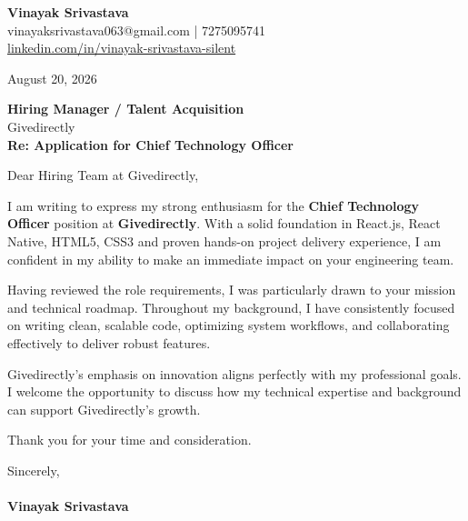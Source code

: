 \documentclass[11pt,a4paper]{article}
\begin{document}
\thispagestyle{empty}

{\Large \textbf{Vinayak Srivastava}}\\
vinayaksrivastava063@gmail.com | 7275095741 \\
\url{linkedin.com/in/vinayak-srivastava-silent}

\vspace{1em}
\hfill August 20, 2026

\textbf{Hiring Manager / Talent Acquisition}\\
Givedirectly\\

\vspace{1.5em}
\textbf{Re: Application for Chief Technology Officer}

\vspace{1em}
Dear Hiring Team at Givedirectly,

I am writing to express my strong enthusiasm for the \textbf{Chief Technology Officer} position at \textbf{Givedirectly}. With a solid foundation in React.js, React Native, HTML5, CSS3 and proven hands-on project delivery experience, I am confident in my ability to make an immediate impact on your engineering team.

Having reviewed the role requirements, I was particularly drawn to your mission and technical roadmap. Throughout my background, I have consistently focused on writing clean, scalable code, optimizing system workflows, and collaborating effectively to deliver robust features.

Givedirectly's emphasis on innovation aligns perfectly with my professional goals. I welcome the opportunity to discuss how my technical expertise and background can support Givedirectly's growth.

Thank you for your time and consideration.

\vspace{1.5em}
Sincerely,\\
\vspace{1em}\\
\textbf{Vinayak Srivastava}
\end{document}
